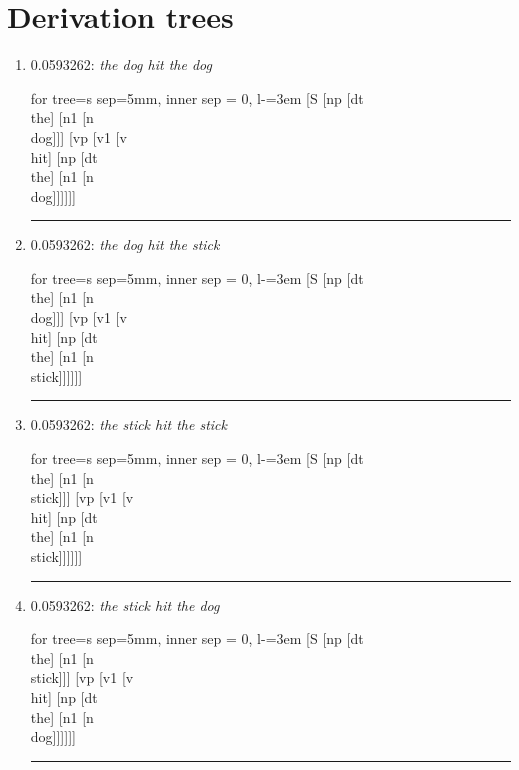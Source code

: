 \documentclass[11pt]{article}
\begin{document}
\section{Derivation trees}
\begin{enumerate}
	\item  0.0593262: \textit{the dog hit the dog} \\[0.5em]
	\begin{forest}
	for tree={s sep=5mm, inner sep = 0, l-=3em}
	[S [np [dt\\the] [n1 [n\\dog]]] [vp [v1 [v\\hit] [np [dt\\the] [n1 [n\\dog]]]]]]
	\end{forest}
	\vspace{2\baselineskip}
	\hrule

	\item  0.0593262: \textit{the dog hit the stick} \\[0.5em]
	\begin{forest}
	for tree={s sep=5mm, inner sep = 0, l-=3em}
	[S [np [dt\\the] [n1 [n\\dog]]] [vp [v1 [v\\hit] [np [dt\\the] [n1 [n\\stick]]]]]]
	\end{forest}
	\vspace{2\baselineskip}
	\hrule

	\item  0.0593262: \textit{the stick hit the stick} \\[0.5em]
	\begin{forest}
	for tree={s sep=5mm, inner sep = 0, l-=3em}
	[S [np [dt\\the] [n1 [n\\stick]]] [vp [v1 [v\\hit] [np [dt\\the] [n1 [n\\stick]]]]]]
	\end{forest}
	\vspace{2\baselineskip}
	\hrule

	\item  0.0593262: \textit{the stick hit the dog} \\[0.5em]
	\begin{forest}
	for tree={s sep=5mm, inner sep = 0, l-=3em}
	[S [np [dt\\the] [n1 [n\\stick]]] [vp [v1 [v\\hit] [np [dt\\the] [n1 [n\\dog]]]]]]
	\end{forest}
	\vspace{2\baselineskip}
	\hrule


\end{enumerate}
\end{document}
